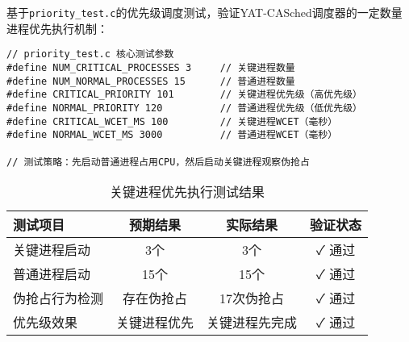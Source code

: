 基于\texttt{priority\_test.c}的优先级调度测试，验证YAT-CASched调度器的一定数量进程优先执行机制：

\begin{tcolorbox} [
    enhanced,
    colback=red!5,
    colframe=red!40!black,
    leftrule=3mm,
    rightrule=0mm,
    toprule=0mm,
    bottomrule=0mm,
    arc=2mm,
    left=5mm,
    right=5mm,
    top=3mm,
    bottom=3mm,
    fonttitle=\bfseries,
    title=\textbf{关键进程优先执行测试配置}
]
\begin{lstlisting}[basicstyle=\footnotesize\fontfamily{zi4}\selectfont, showstringspaces=false]
// priority_test.c 核心测试参数
#define NUM_CRITICAL_PROCESSES 3     // 关键进程数量
#define NUM_NORMAL_PROCESSES 15      // 普通进程数量  
#define CRITICAL_PRIORITY 101        // 关键进程优先级（高优先级）
#define NORMAL_PRIORITY 120          // 普通进程优先级（低优先级）
#define CRITICAL_WCET_MS 100         // 关键进程WCET（毫秒）
#define NORMAL_WCET_MS 3000          // 普通进程WCET（毫秒）

// 测试策略：先启动普通进程占用CPU，然后启动关键进程观察伪抢占
\end{lstlisting}
\end{tcolorbox}

\begin{table}[H]
\centering
\caption{关键进程优先执行测试结果}
\label{tab:priority-test-results}
\begin{tabular}{|l|c|c|c|}
\hline
\textbf{测试项目} & \textbf{预期结果} & \textbf{实际结果} & \textbf{验证状态} \\
\hline
关键进程启动 & 3个 & 3个 & ✓ 通过 \\
\hline
普通进程启动 & 15个 & 15个 & ✓ 通过 \\
\hline
伪抢占行为检测 & 存在伪抢占 & 17次伪抢占 & ✓ 通过 \\
\hline
优先级效果 & 关键进程优先 & 关键进程先完成 & ✓ 通过 \\
\hline
\end{tabular}
\end{table}

